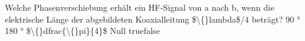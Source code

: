     {Welche Phasenverschiebung erhält ein HF-Signal von a nach b, wenn die elektrische Länge der abgebildeten Koaxialleitung \$\textbackslash\{\}lambda\$/4 beträgt?}
    {90 °}
    {180 °}
    {\$\textbackslash\{\}dfrac\{\textbackslash\{\}pi\}\{4\}\$}
    {Null}
    {true}{false}